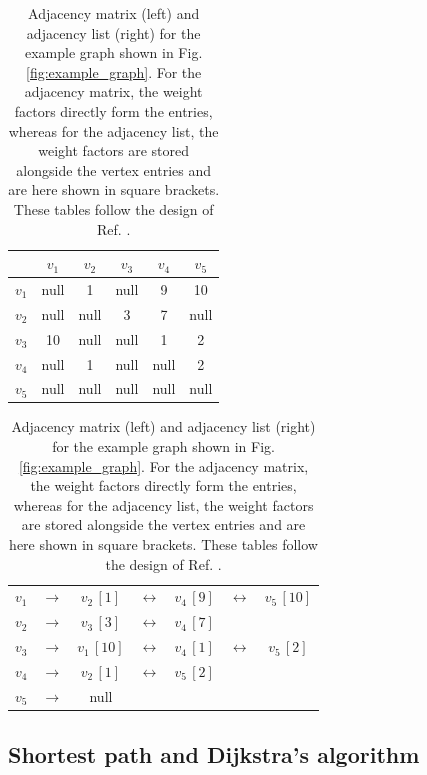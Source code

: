 \begin{table}[h]
	\centering
	\begin{tabular}{|c|ccccc|}
			\hline
			      & $v_1$ & $v_2$ & $v_3$ & $v_4$ & $v_5$ \tabularnewline
			\hline
			$v_1$ &  null &     1 &  null &     9 &    10 \tabularnewline
			$v_2$ &  null &  null &     3 &     7 &  null \tabularnewline
			$v_3$ &    10 &  null &  null &     1 &     2 \tabularnewline
			$v_4$ &  null &     1 &  null &  null &     2 \tabularnewline
			$v_5$ &  null &  null &  null &  null &  null \tabularnewline
			\hline
	\end{tabular}
	\hspace{1cm}
	\begin{tabular}{|c|c|ccccc|}
			\cline{1-1} \cline{3-7}
			$v_1$ &  $\rightarrow$ &  $v_2\, [1]$ &  $\leftrightarrow$ &  $v_4\, [9]$ &  $\leftrightarrow$  & $v_5\, [10]$ \tabularnewline
			\cline{1-1} \cline{3-7}
			$v_2$ &  $\rightarrow$ &  $v_3\, [3]$ &  $\leftrightarrow$ &  $v_4\, [7]$ &   &  \tabularnewline
			\cline{1-1} \cline{3-7}
			$v_3$ &  $\rightarrow$ &  $v_1\, [10]$ &  $\leftrightarrow$ &  $v_4\, [1]$ &  $\leftrightarrow$  & $v_5\, [2]$ \tabularnewline
			\cline{1-1} \cline{3-7}
			$v_4$ &  $\rightarrow$ &  $v_2\, [1]$ & $\leftrightarrow$  &  $v_5\, [2]$ &   &  \tabularnewline
			\cline{1-1} \cline{3-7}
			$v_5$ &  $\rightarrow$ & null &   &   &   &  \tabularnewline
			\cline{1-1} \cline{3-7}
	\end{tabular}
	\caption[Adjacency matrix and list.]{
		Adjacency matrix (left) and adjacency list (right) for the example graph shown in Fig. \ref{fig:example_graph}.
		For the adjacency matrix, the weight factors directly form the entries, whereas for the adjacency list, 
		the weight factors are stored alongside the vertex entries and are here shown in square brackets.
		These tables follow the design of Ref. \cite[p. 5, Fig. 4.3]{FUH_algo_graphs_2021}.}
	\label{tab:example_graph_structure}
\end{table}



\subsection{Shortest path and Dijkstra's algorithm}
\label{sec:dijkstra}
